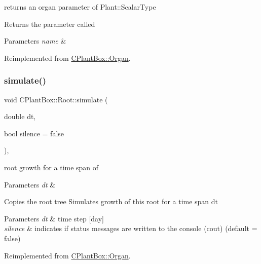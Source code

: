 returns an organ parameter of Plant\+::\+Scalar\+Type 

Returns the parameter called 
\begin{DoxyParams}{Parameters}
{\em name} & \\
\hline
\end{DoxyParams}


Reimplemented from \hyperlink{classCPlantBox_1_1Organ_adf7d115c625341e0f6d291c750b05e5c}{C\+Plant\+Box\+::\+Organ}.

\mbox{\label{classCPlantBox_1_1Root_af2fa9d229ab05897214e0ec224f0ae71}} 
\subsubsection{\texorpdfstring{simulate()}{simulate()}}
{\footnotesize\ttfamily void C\+Plant\+Box\+::\+Root\+::simulate (\begin{DoxyParamCaption}\item[{double}]{dt,  }\item[{bool}]{silence = {\ttfamily false} }\end{DoxyParamCaption})\hspace{0.3cm}{\ttfamily [override]}, {\ttfamily [virtual]}}



root growth for a time span of 


\begin{DoxyParams}{Parameters}
{\em dt} & \\
\hline
\end{DoxyParams}
Copies the root tree Simulates growth of this root for a time span dt


\begin{DoxyParams}{Parameters}
{\em dt} & time step \mbox{[}day\mbox{]} \\
\hline
{\em silence} & indicates if status messages are written to the console (cout) (default = false) \\
\hline
\end{DoxyParams}


Reimplemented from \hyperlink{classCPlantBox_1_1Organ_acf519fc6730c0adbb2a82b7702ff7a28}{C\+Plant\+Box\+::\+Organ}.

\mbox{\label{classCPlantBox_1_1Root_a389312a40582e21c1eaa6c5ebb927f2e}} 
